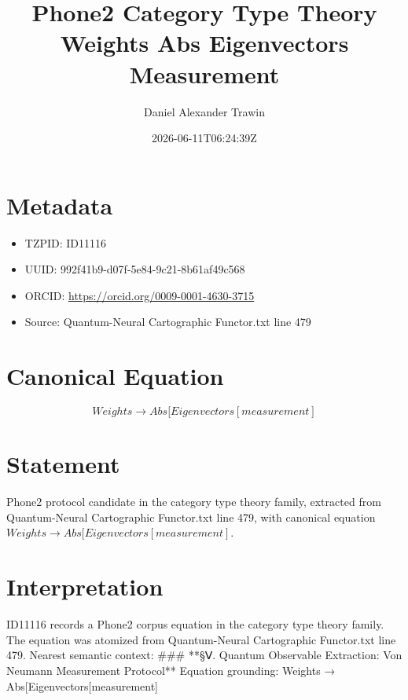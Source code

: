 \documentclass[11pt]{article}
\title{Phone2 Category Type Theory Weights Abs Eigenvectors Measurement}
\author{Daniel Alexander Trawin}
\date{2026-06-11T06:24:39Z}
\begin{document}
\maketitle
\section*{Metadata}
\begin{itemize}
\item TZPID: ID11116
\item UUID: 992f41b9-d07f-5e84-9c21-8b61af49c568
\item ORCID: \url{https://orcid.org/0009-0001-4630-3715}
\item Source: Quantum-Neural Cartographic Functor.txt line 479
\end{itemize}
\section*{Canonical Equation}
\[
Weights → Abs[Eigenvectors[measurement]
\]
\section*{Statement}
Phone2 protocol candidate in the category type theory family, extracted from Quantum-Neural Cartographic Functor.txt line 479, with canonical equation $Weights → Abs[Eigenvectors[measurement]$.
\section*{Interpretation}
ID11116 records a Phone2 corpus equation in the category type theory family. The equation was atomized from Quantum-Neural Cartographic Functor.txt line 479. Nearest semantic context: ### **§Ⅴ. Quantum Observable Extraction: Von Neumann Measurement Protocol** Equation grounding: Weights → Abs[Eigenvectors[measurement]
\end{document}
